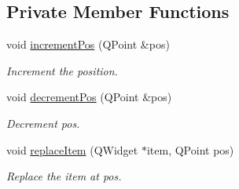 \subsection*{Private Member Functions}
\begin{DoxyCompactItemize}
\item 
\hypertarget{class_u_i_1_1_item_grid_widget_ab6325cea6caa90ab5b85f0d3c261d520}{void \hyperlink{class_u_i_1_1_item_grid_widget_ab6325cea6caa90ab5b85f0d3c261d520}{increment\-Pos} (Q\-Point \&pos)}\label{class_u_i_1_1_item_grid_widget_ab6325cea6caa90ab5b85f0d3c261d520}

\begin{DoxyCompactList}\small\item\em Increment the position. \end{DoxyCompactList}\item 
\hypertarget{class_u_i_1_1_item_grid_widget_a31f04f5d63199ff1f27f2a4614b20701}{void \hyperlink{class_u_i_1_1_item_grid_widget_a31f04f5d63199ff1f27f2a4614b20701}{decrement\-Pos} (Q\-Point \&pos)}\label{class_u_i_1_1_item_grid_widget_a31f04f5d63199ff1f27f2a4614b20701}

\begin{DoxyCompactList}\small\item\em Decrement pos. \end{DoxyCompactList}\item 
\hypertarget{class_u_i_1_1_item_grid_widget_accafcedf50a28b027f29e6358263dbba}{void \hyperlink{class_u_i_1_1_item_grid_widget_accafcedf50a28b027f29e6358263dbba}{replace\-Item} (Q\-Widget $\ast$item, Q\-Point pos)}\label{class_u_i_1_1_item_grid_widget_accafcedf50a28b027f29e6358263dbba}

\begin{DoxyCompactList}\small\item\em Replace the item at pos. \end{DoxyCompactList}\end{DoxyCompactItemize}
